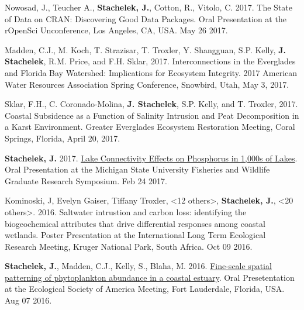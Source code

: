 \documentclass[11pt]{article}
\makeatletter
\newlength{\bibhang}
\newlength{\bibsep}
 {\@listi \global\bibsep\itemsep \global\advance\bibsep by\parsep}
\newenvironment{bibenum*}
  {\renewcommand\labelenumi{[\theenumi]}%
   \etaremune[
     topsep=0pt,
     itemsep=\bibsep,
     parsep=0pt,partopsep=0pt,
     itemindent=-\bibhang,
     leftmargin=0.8em
     ]
     }
  {\endetaremune}
\makeatother
\begin{document}
\begin{bibenum*}
    \item Nowosad, J., Teucher A., \textbf{Stachelek, J.}, Cotton, R., Vitolo, C. 2017. The State of Data on CRAN: Discovering Good Data Packages. Oral Presentation at the rOpenSci Unconference, Los Angeles, CA, USA. May 26 2017.

    \item Madden, C.J., M. Koch, T. Strazisar, T. Troxler, Y. Shangguan, S.P. Kelly, \textbf{J. Stachelek}, R.M. Price, and F.H. Sklar, 2017. Interconnections in the Everglades and Florida Bay Watershed: Implications for Ecosystem Integrity. 2017 American Water Resources Association Spring Conference, Snowbird, Utah, May 3, 2017.

    \item Sklar, F.H., C. Coronado-Molina, \textbf{J. Stachelek}, S.P. Kelly, and T. Troxler, 2017. Coastal Subsidence as a Function of Salinity Intrusion and Peat Decomposition in a Karst Environment. Greater Everglades Ecosystem Restoration Meeting, Coral Springs, Florida, April 20, 2017.

    \item \textbf{Stachelek, J.} 2017. \href{https://doi.org/10.6084/m9.figshare.8187038.v1}{Lake Connectivity Effects on Phosphorus in 1,000s of Lakes}. Oral Presentation at the Michigan State University Fisheries and Wildlife Graduate Research Symposium. Feb 24 2017.

    \item Kominoski, J, Evelyn Gaiser, Tiffany Troxler, <12 others>, \textbf{Stachelek, J.}, <20 others>. 2016. Saltwater intrustion and carbon loss: identifying the biogeochemical attributes that drive differential responses among coastal wetlands. Poster Presentation at the International Long Term Ecological Research Meeting, Kruger National Park, South Africa. Oct 09 2016.

    \item \textbf{Stachelek, J.}, Madden, C.J., Kelly, S., Blaha, M. 2016. \href{https://doi.org/10.6084/m9.figshare.2775322.v4}{Fine-scale spatial patterning of phytoplankton abundance in a coastal estuary}. Oral Presetentation at the Ecological Society of America Meeting, Fort Lauderdale, Florida, USA. Aug 07 2016.


\end{bibenum*}
\end{document}
